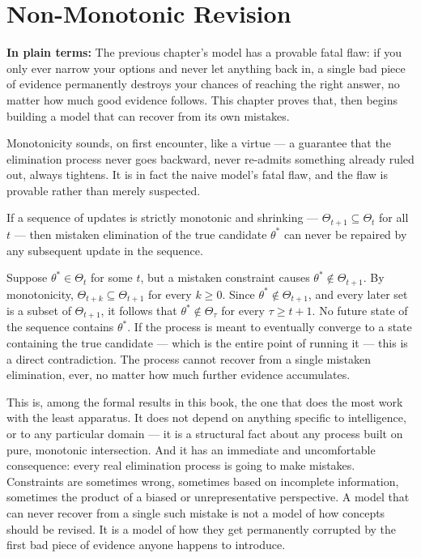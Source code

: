 \chapter{Non-Monotonic Revision}
\label{ch:nonmonotonic}

\begin{plainlanguage}
\textbf{In plain terms:} The previous chapter's model has a provable fatal flaw: if you only ever narrow your options and never let anything back in, a single bad piece of evidence permanently destroys your chances of reaching the right answer, no matter how much good evidence follows. This chapter proves that, then begins building a model that can recover from its own mistakes.
\end{plainlanguage}

Monotonicity sounds, on first encounter, like a virtue --- a guarantee that the elimination process never goes backward, never re-admits something already ruled out, always tightens. It is in fact the naive model's fatal flaw, and the flaw is provable rather than merely suspected.

\begin{theorem}
\label{thm:irreversible}
If a sequence of updates is strictly monotonic and shrinking --- $\Theta_{t+1} \subseteq \Theta_t$ for all $t$ --- then mistaken elimination of the true candidate $\theta^*$ can never be repaired by any subsequent update in the sequence.
\end{theorem}

\begin{proofsketch}
Suppose $\theta^* \in \Theta_t$ for some $t$, but a mistaken constraint causes $\theta^* \notin \Theta_{t+1}$. By monotonicity, $\Theta_{t+k} \subseteq \Theta_{t+1}$ for every $k \geq 0$. Since $\theta^* \notin \Theta_{t+1}$, and every later set is a subset of $\Theta_{t+1}$, it follows that $\theta^* \notin \Theta_\tau$ for every $\tau \geq t+1$. No future state of the sequence contains $\theta^*$. If the process is meant to eventually converge to a state containing the true candidate --- which is the entire point of running it --- this is a direct contradiction. The process cannot recover from a single mistaken elimination, ever, no matter how much further evidence accumulates. \qedhere
\end{proofsketch}

This is, among the formal results in this book, the one that does the most work with the least apparatus. It does not depend on anything specific to intelligence, or to any particular domain --- it is a structural fact about any process built on pure, monotonic intersection. And it has an immediate and uncomfortable consequence: every real elimination process is going to make mistakes. Constraints are sometimes wrong, sometimes based on incomplete information, sometimes the product of a biased or unrepresentative perspective. A model that can never recover from a single such mistake is not a model of how concepts should be revised. It is a model of how they get permanently corrupted by the first bad piece of evidence anyone happens to introduce.

